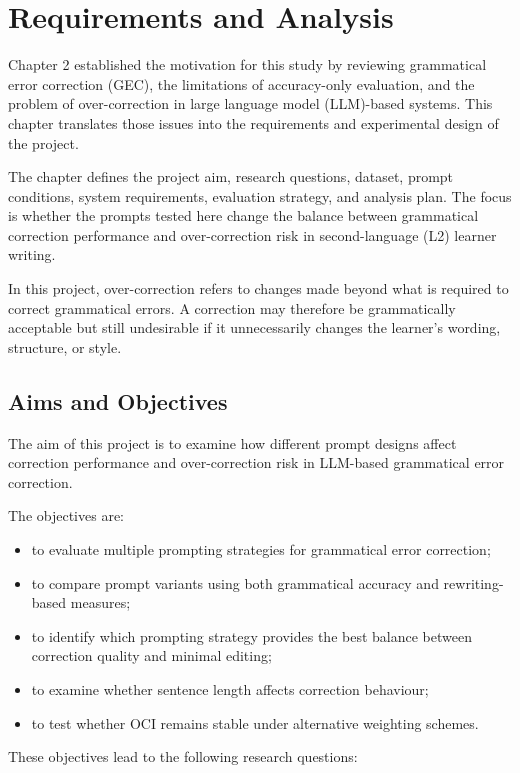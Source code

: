 \chapter{Requirements and Analysis}

Chapter 2 established the motivation for this study by reviewing grammatical error correction (GEC), the limitations of accuracy-only evaluation, and the problem of over-correction in large language model (LLM)-based systems. This chapter translates those issues into the requirements and experimental design of the project.

The chapter defines the project aim, research questions, dataset, prompt conditions, system requirements, evaluation strategy, and analysis plan. The focus is whether the prompts tested here change the balance between grammatical correction performance and over-correction risk in second-language (L2) learner writing.

In this project, over-correction refers to changes made beyond what is required to correct grammatical errors. A correction may therefore be grammatically acceptable but still undesirable if it unnecessarily changes the learner's wording, structure, or style.

\section{Aims and Objectives}

The aim of this project is to examine how different prompt designs affect correction performance and over-correction risk in LLM-based grammatical error correction.

The objectives are:

\begin{itemize}
    \item to evaluate multiple prompting strategies for grammatical error correction;
    \item to compare prompt variants using both grammatical accuracy and rewriting-based measures;
    \item to identify which prompting strategy provides the best balance between correction quality and minimal editing;
    \item to examine whether sentence length affects correction behaviour;
    \item to test whether OCI remains stable under alternative weighting schemes.
\end{itemize}

These objectives lead to the following research questions:

